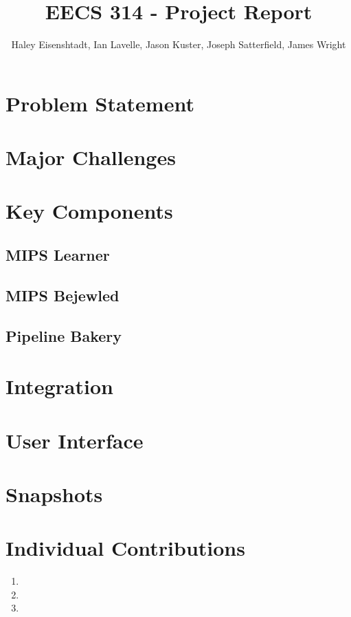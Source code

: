 \documentclass[12pt]{article}
\title{EECS 314 - Project Report}
\author{Haley Eisenshtadt, Ian Lavelle, Jason Kuster, Joseph Satterfield, James Wright}
\begin{document}
	\maketitle
	\section{Problem Statement}
	\section{Major Challenges}
	\section{Key Components}
	\subsection{MIPS Learner}
	\subsection{MIPS Bejewled}
	\subsection{Pipeline Bakery}
	\section{Integration}
	\section{User Interface}
	\section{Snapshots}
	\section{Individual Contributions}
	\begin{enumerate}
		\item
		\item
		\item
	\end{enumerate}
\end{document}
